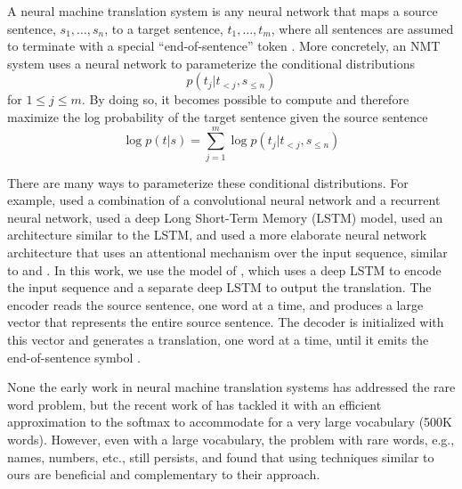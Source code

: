 
A neural machine translation system is any neural network that maps a source 
sentence, $s_1,\ldots,s_n$,
to a target sentence, $t_1,\ldots,t_m$, where all sentences are assumed to 
terminate with a special
``end-of-sentence'' token \eossym{}.  More concretely, an NMT system uses a neural 
network to parameterize the conditional distributions
\begin{equation}
p(t_j|t_{<j},s_{\leq n})
\end{equation}
for $1\leq j \leq m$.  By doing so, it becomes possible to 
compute and therefore maximize the log probability
of the target sentence given the source sentence
\begin{equation}
\log p(t|s) = \sum_{j=1}^m  \log p\left(t_j|t_{<j},s_{\leq n}\right)
\end{equation}

\begin{sloppypar}
There are many ways to parameterize these conditional distributions.
For example,  used a combination of a
convolutional neural network and a recurrent neural network,  used a deep Long Short-Term Memory
(LSTM) model,  used an architecture similar to the LSTM, and
 used a more elaborate neural network
architecture that uses an attentional mechanism over the input sequence, 
similar to  and .  
In this work, we use the model of , which 
uses a deep LSTM to encode the input sequence and a separate deep LSTM 
to output the translation. The encoder reads the 
source sentence, one word at a time, and produces
a large vector that represents the entire source sentence. 
The decoder is initialized with this vector
and generates a translation, one word at a time, 
until it emits the end-of-sentence symbol \eossym{}.
\end{sloppypar}

None the early work in neural machine translation systems has addressed the rare word problem,
but the recent work of  has tackled it with 
an efficient approximation to the softmax to accommodate for a very large vocabulary (500K words). However, even with a large vocabulary, the problem with rare words, e.g., names, numbers, etc., still persists, and  found that using techniques similar to ours are beneficial and complementary to their approach.
